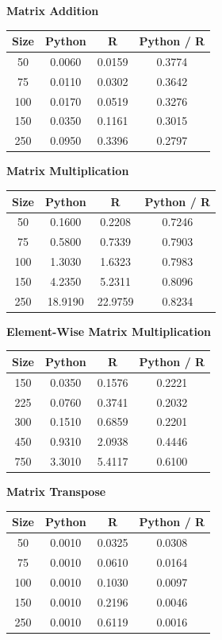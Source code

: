 \documentclass[%
  final,
  notitlepage,
  narroweqnarray,
  inline,
]{ieee}
\begin{document}
\begin{table}[h!]
  \begin{center}
    \vspace{1em}
    \textbf{Matrix Addition} \\
    \begin{tabular}{cccc}
      Size  & Python  &  R      & Python / R \\
      \hline
      50  & 0.0060 & 0.0159 & 0.3774 \\
      75  & 0.0110 & 0.0302 & 0.3642 \\
      100 & 0.0170 & 0.0519 & 0.3276 \\
      150 & 0.0350 & 0.1161 & 0.3015 \\
      250 & 0.0950 & 0.3396 & 0.2797 \\
    \end{tabular}

    \vspace{1em}
    \textbf{Matrix Multiplication} \\
    \begin{tabular}{cccc}
      Size  & Python  &  R    & Python / R \\
      \hline
      50  & 0.1600  & 0.2208  & 0.7246 \\
      75  & 0.5800  & 0.7339  & 0.7903 \\
      100 & 1.3030  & 1.6323  & 0.7983 \\
      150 & 4.2350  & 5.2311  & 0.8096 \\
      250 & 18.9190 & 22.9759 & 0.8234 \\
    \end{tabular}

    \vspace{1em}
    \textbf{Element-Wise Matrix Multiplication} \\
    \begin{tabular}{cccc}
      Size  & Python  &  R       & Python / R \\
      \hline
      150   & 0.0350  &  0.1576  &  0.2221 \\
      225   & 0.0760  &  0.3741  &  0.2032 \\
      300   & 0.1510  &  0.6859  &  0.2201 \\
      450   & 0.9310  &  2.0938  &  0.4446 \\
      750   & 3.3010  &  5.4117  &  0.6100 \\
    \end{tabular}

    \vspace{1em}
    \textbf{Matrix Transpose} \\
    \begin{tabular}{cccc}
      Size  & Python  &  R       & Python / R \\
      \hline
      50  & 0.0010  & 0.0325 & 0.0308 \\
      75  & 0.0010  & 0.0610 & 0.0164 \\
      100 & 0.0010  & 0.1030 & 0.0097 \\
      150 & 0.0010  & 0.2196 & 0.0046 \\
      250 & 0.0010  & 0.6119 & 0.0016 \\
    \end{tabular}


\end{center}
\end{table}
\end{document}
